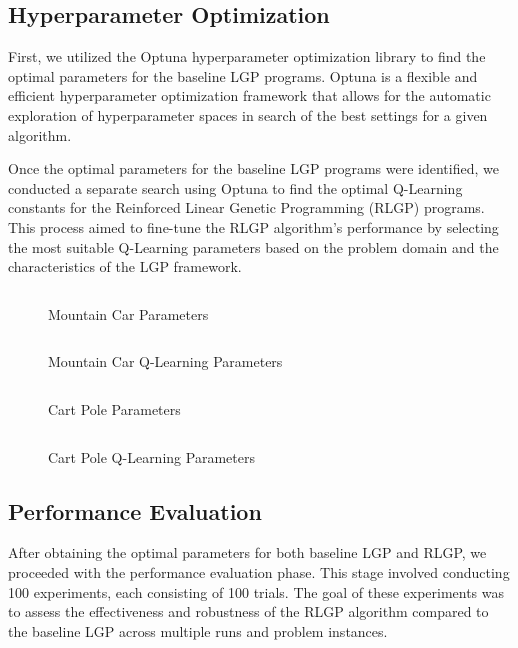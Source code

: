 \documentclass[12pt, final]{dalcsthesis}
\begin{document}
\subsection{Hyperparameter Optimization}

First, we utilized the Optuna hyperparameter optimization library \cite{akiba2019optuna} to find the optimal parameters for the baseline LGP programs. Optuna is a flexible and efficient hyperparameter optimization framework that allows for the automatic exploration of hyperparameter spaces in search of the best settings for a given algorithm.

Once the optimal parameters for the baseline LGP programs were identified, we conducted a separate search using Optuna to find the optimal Q-Learning constants for the Reinforced Linear Genetic Programming (RLGP) programs. This process aimed to fine-tune the RLGP algorithm's performance by selecting the most suitable Q-Learning parameters based on the problem domain and the characteristics of the LGP framework.

\begin{figure}[hb]
  \centering
  \inputminted[breaklines]{json}{../assets/parameters/mountain-car.json}
  \caption{Mountain Car Parameters}
  \label{code:mountain-car-parameters}
\end{figure}

\begin{figure}[hb]
  \centering
  \inputminted[breaklines]{json}{../assets/parameters/mountain-car-q.json}
  \caption{Mountain Car Q-Learning Parameters}
  \label{code:mountain-car-q-parameters}
\end{figure}

\begin{figure}[hb]
  \centering
  \inputminted[breaklines]{json}{../assets/parameters/cart-pole.json}
  \caption{Cart Pole Parameters}
  \label{code:cart-pole-parameters}
\end{figure}

\begin{figure}[hb]
  \centering
  \inputminted[breaklines]{json}{../assets/parameters/cart-pole-q.json}
  \caption{Cart Pole Q-Learning Parameters}
  \label{code:cart-pole-q-parameters}
\end{figure}

\subsection{Performance Evaluation}

After obtaining the optimal parameters for both baseline LGP and RLGP, we proceeded with the performance evaluation phase. This stage involved conducting 100 experiments, each consisting of 100 trials. The goal of these experiments was to assess the effectiveness and robustness of the RLGP algorithm compared to the baseline LGP across multiple runs and problem instances.
\end{document}
